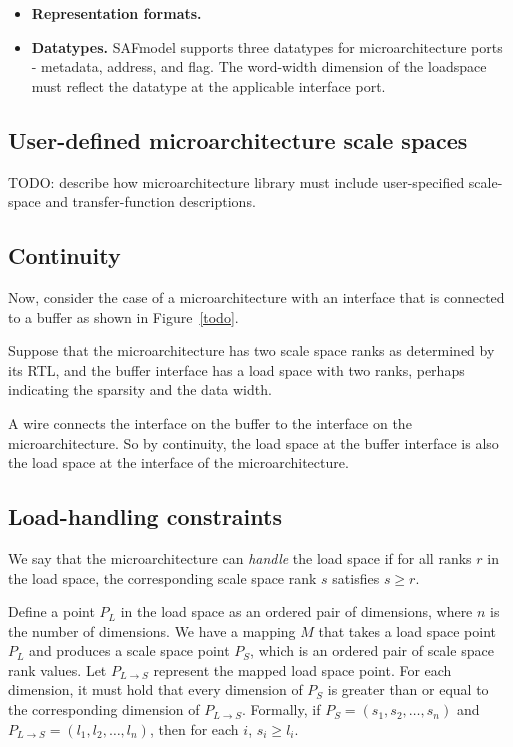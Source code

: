 \begin{itemize}
    \item \textbf{Representation formats.}
    \item \textbf{Datatypes.} SAFmodel supports three datatypes for microarchitecture ports - metadata, address, and flag. The word-width dimension of the loadspace must reflect the datatype at the applicable interface port.
\end{itemize}

\subsection{User-defined microarchitecture scale spaces}

TODO: describe how microarchitecture library must include user-specified scale-space and transfer-function descriptions.

\subsection{Continuity}

Now, consider the case of a microarchitecture with an interface that is connected to a buffer as shown in Figure~\ref{todo}.

Suppose that the microarchitecture has two scale space ranks as determined by its RTL, and the buffer interface has a load space with two ranks, perhaps indicating the sparsity and the data width.

A wire connects the interface on the buffer to the interface on the microarchitecture. So by continuity, the load space at the buffer interface is also the load space at the interface of the microarchitecture.

\subsection{Load-handling constraints}

We say that the microarchitecture can \textit{handle} the load space if for all ranks $r$ in the load space, the corresponding scale space rank $s$ satisfies $s \geq r$.

Define a point $P_L$ in the load space as an ordered pair of dimensions, where $n$ is the number of dimensions. We have a mapping $M$ that takes a load space point $P_L$ and produces a scale space point $P_S$, which is an ordered pair of scale space rank values. Let $P_{L \rightarrow S}$ represent the mapped load space point. For each dimension, it must hold that every dimension of $P_S$ is greater than or equal to the corresponding dimension of $P_{L \rightarrow S}$. Formally, if $P_S = (s_1, s_2, \ldots, s_n)$ and $P_{L \rightarrow S} = (l_1, l_2, \ldots, l_n)$, then for each $i$, $s_i \geq l_i$.

